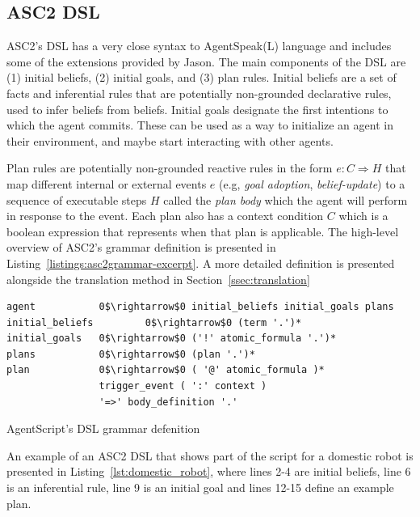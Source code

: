 \subsection{ASC2 DSL}
\label{section_dsl}

ASC2's DSL has a very close syntax to AgentSpeak(L) language and includes some of the extensions provided by Jason. The main components of the DSL are (1) initial beliefs, (2) initial goals, and (3) plan rules. Initial beliefs are a set of facts and inferential rules that are potentially non-grounded declarative rules, used to infer beliefs from beliefs. Initial goals designate the first intentions to which the agent commits. These can be used as a way to initialize an agent in their environment, and maybe start interacting with other agents. 

Plan rules are potentially non-grounded reactive rules in the form $e : C \Rightarrow H$ that map different internal or external events $e$ (e.g, \textit{goal adoption}, \textit{belief-update}) to a sequence of executable steps $H$ called the \textit{plan body} which the agent will perform in response to the event. 
Each plan also has a context condition $C$ which is a boolean expression that represents when that plan is applicable. The high-level overview of ASC2's grammar definition is presented in Listing~\ref{listings:asc2grammar-excerpt}. A more detailed definition is presented alongside the translation method in Section~\ref{ssec:translation}

\begin{listing}[!htb]
\begin{verbatim}
agent           0$\rightarrow$0 initial_beliefs initial_goals plans
initial_beliefs         0$\rightarrow$0 (term '.')*
initial_goals   0$\rightarrow$0 ('!' atomic_formula '.')*
plans           0$\rightarrow$0 (plan '.')*
plan            0$\rightarrow$0 ( '@' atomic_formula )*
                trigger_event ( ':' context )
                '=>' body_definition '.'
\end{verbatim}
\caption{AgentScript's DSL grammar defenition}
\label{listings:asc2grammar-excerpt}
\end{listing}%


An example of an ASC2 DSL that shows part of the script for a domestic robot is presented in Listing~\ref{lst:domestic_robot}, where lines 2-4 are initial beliefs, line 6 is an inferential rule, line 9 is an initial goal and lines 12-15 define an example plan.

